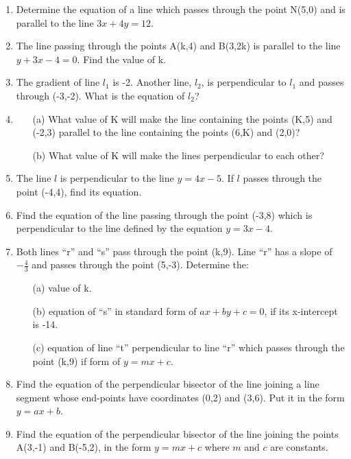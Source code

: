 \begin{enumerate}
	\item Determine the equation of a line which passes through the point N(5,0) and is parallel to the line $3x + 4y = 12$.
	
	\item The line passing through the points A(k,4) and B(3,2k) is parallel to the line $y + 3x - 4 = 0$. Find the value of k.
	
	
	

	\item The gradient of line $l_1$ is -2. Another line, $l_2$, is perpendicular to $l_1$ and passes through (-3,-2). What is the equation of $l_2$?
	
	\item 
	\begin{itemize}
	\item[(a)] What value of K will make the line containing the points (K,5) and (-2,3) parallel to the line containing the points (6,K) and (2,0)?
	\item[(b)] What value of K will make the lines perpendicular to each other?
	\end{itemize}
	
	\item The line $l$ is perpendicular to the line $y = 4x - 5$. If $l$ passes through the point (-4,4), find its equation.
	
	\item Find the equation of the line passing through the point (-3,8) which is perpendicular to the line defined by the equation $y = 3x - 4$.
	
	\item Both lines ``r'' and ``s'' pass through the point (k,9). Line ``r'' has a slope of $-\frac{4}{3}$ and passes through the point (5,-3). Determine the:
	\begin{itemize}
	\item[(a)] value of k.
	\item[(b)] equation of ``s'' in standard form of $ax + by + c = 0$, if its x-intercept is -14.
	\item[(c)] equation of line ``t'' perpendicular to line ``r'' which passes through the point (k,9) if form of $y = mx + c$.
	\end{itemize}
	
	\item Find the equation of the perpendicular bisector of the line joining a line segment whose end-points have coordinates (0,2) and (3,6). Put it in the form $y = ax + b$.
	
	\item Find the equation of the perpendicular bisector of the line joining the points A(3,-1) and B(-5,2), in the form $y = mx + c$ where $m$ and $c$ are constants.
	

\end{enumerate}
